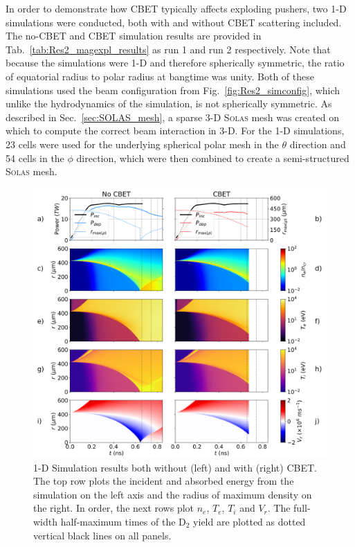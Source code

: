 In order to demonstrate how \ac{CBET} typically affects exploding pushers, two 1-D simulations were conducted, both with and without \ac{CBET} scattering included.
The no-\ac{CBET} and \ac{CBET} simulation results are provided in Tab.~\ref{tab:Res2_magexpl_results} as run 1 and run 2 respectively.
Note that because the simulations were 1-D and therefore spherically symmetric, the ratio of equatorial radius to polar radius at bangtime was unity.
Both of these simulations used the beam configuration from Fig.~\ref{fig:Res2_simconfig}, which unlike the hydrodynamics of the simulation, is not spherically symmetric.
As described in Sec.~\ref{sec:SOLAS_mesh}, a sparse 3-D \textsc{Solas} mesh was created on which to compute the correct beam interaction in 3-D.
For the 1-D simulations, 23 cells were used for the underlying spherical polar mesh in the $\theta$ direction and 54 cells in the $\phi$ direction, which were then combined to create a semi-structured \textsc{Solas} mesh.

\begin{figure}[t!]
    \includegraphics[width=\linewidth]{Results2/Images/expl_streaks.png}
    \centering
    \caption{1-D Simulation results both without (left) and with (right) \ac{CBET}.
    The top row plots the incident and absorbed energy from the simulation on the left axis and the radius of maximum density on the right.
    In order, the next rows plot $n_e$, $T_e$, $T_i$ and $V_r$.
    The full-width half-maximum times of the D${}_{2}$ yield are plotted as dotted vertical black lines on all panels.}%
    \label{fig:Res2_expl_streaks}
\end{figure}

